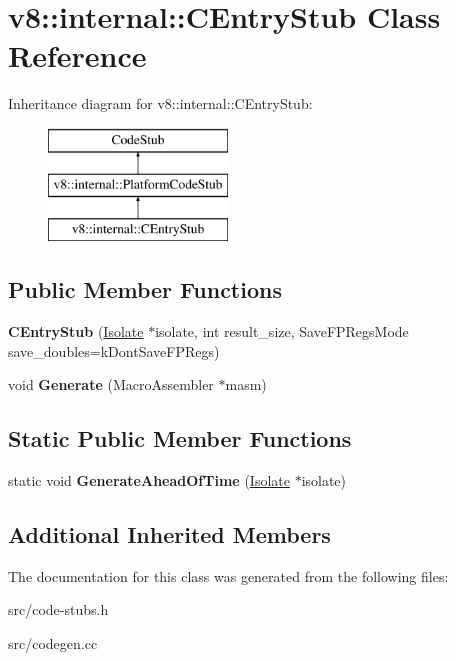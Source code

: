 \hypertarget{classv8_1_1internal_1_1_c_entry_stub}{}\section{v8\+:\+:internal\+:\+:C\+Entry\+Stub Class Reference}
\label{classv8_1_1internal_1_1_c_entry_stub}
Inheritance diagram for v8\+:\+:internal\+:\+:C\+Entry\+Stub\+:\begin{figure}[H]
\begin{center}
\leavevmode
\includegraphics[height=3.000000cm]{classv8_1_1internal_1_1_c_entry_stub}
\end{center}
\end{figure}
\subsection*{Public Member Functions}
\begin{DoxyCompactItemize}
\item 
\hypertarget{classv8_1_1internal_1_1_c_entry_stub_ae5cf98b3d3f7389b80f51149a8e3b3c6}{}{\bfseries C\+Entry\+Stub} (\hyperlink{classv8_1_1internal_1_1_isolate}{Isolate} $\ast$isolate, int result\+\_\+size, Save\+F\+P\+Regs\+Mode save\+\_\+doubles=k\+Dont\+Save\+F\+P\+Regs)\label{classv8_1_1internal_1_1_c_entry_stub_ae5cf98b3d3f7389b80f51149a8e3b3c6}

\item 
\hypertarget{classv8_1_1internal_1_1_c_entry_stub_ae2034c995d85fec0256126e4d3eb7843}{}void {\bfseries Generate} (Macro\+Assembler $\ast$masm)\label{classv8_1_1internal_1_1_c_entry_stub_ae2034c995d85fec0256126e4d3eb7843}

\end{DoxyCompactItemize}
\subsection*{Static Public Member Functions}
\begin{DoxyCompactItemize}
\item 
\hypertarget{classv8_1_1internal_1_1_c_entry_stub_a745be7efd2cfdffd043bc90a1a2e6aea}{}static void {\bfseries Generate\+Ahead\+Of\+Time} (\hyperlink{classv8_1_1internal_1_1_isolate}{Isolate} $\ast$isolate)\label{classv8_1_1internal_1_1_c_entry_stub_a745be7efd2cfdffd043bc90a1a2e6aea}

\end{DoxyCompactItemize}
\subsection*{Additional Inherited Members}


The documentation for this class was generated from the following files\+:\begin{DoxyCompactItemize}
\item 
src/code-\/stubs.\+h\item 
src/codegen.\+cc\end{DoxyCompactItemize}
